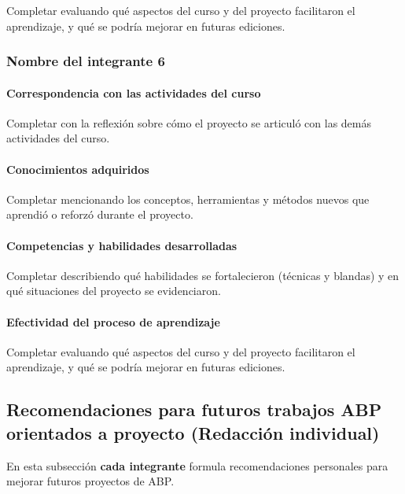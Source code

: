 \documentclass[11pt,a4paper]{article}
\begin{document}
Completar evaluando qué aspectos del curso y del proyecto facilitaron el
aprendizaje, y qué se podría mejorar en futuras ediciones.

\subsubsection*{Nombre del integrante 6}


\paragraph{Correspondencia con las actividades del curso}

Completar con la reflexión sobre cómo el proyecto se articuló con las demás
actividades del curso.

\paragraph{Conocimientos adquiridos}

Completar mencionando los conceptos, herramientas y métodos nuevos que
aprendió o reforzó durante el proyecto.

\paragraph{Competencias y habilidades desarrolladas}

Completar describiendo qué habilidades se fortalecieron (técnicas y blandas)
y en qué situaciones del proyecto se evidenciaron.

\paragraph{Efectividad del proceso de aprendizaje}

Completar evaluando qué aspectos del curso y del proyecto facilitaron el
aprendizaje, y qué se podría mejorar en futuras ediciones.

\subsection{Recomendaciones para futuros trabajos ABP orientados a proyecto (Redacción individual)}
\label{subsec:recomendaciones_abp}

En esta subsección \textbf{cada integrante} formula recomendaciones personales
para mejorar futuros proyectos de ABP.
\end{document}
